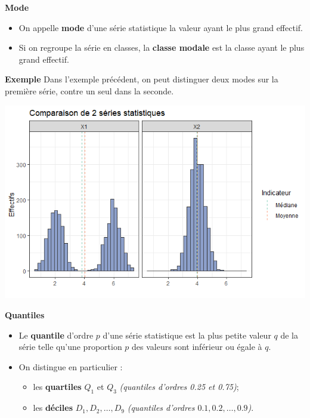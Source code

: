 \documentclass[aspectratio=169,xcolor=dvipsnames]{beamer}
\begin{document}
\begin{frame}
	\begin{block}{\textbf{Mode}}
\begin{footnotesize}
		\begin{itemize}
		\item On appelle \textbf{mode} d'une série statistique la valeur ayant le plus grand effectif.
		\item Si on regroupe la série en classes, la \textbf{classe modale} est la classe ayant le plus grand effectif.
		\end{itemize}
\end{footnotesize}
	\end{block}
	
	\begin{exampleblock}{\textbf{Exemple}}
{\footnotesize 	Dans l'exemple précédent, on peut distinguer deux modes sur la première série, contre un seul dans la seconde.}
		\begin{center}
		\includegraphics[scale=0.35]{comp_moy_med.png}
		\end{center}
	\end{exampleblock}
\end{frame}

\begin{frame}
	\begin{block}{\textbf{Quantiles}}
		\begin{itemize}
		\item Le \textbf{quantile} d'ordre $p$ d'une série statistique est la plus petite valeur $q$ de la série telle qu'une proportion $p$ des valeurs sont inférieur ou égale à $q$.
		\item On distingue en particulier :
			\begin{itemize}
			\item les \textbf{quartiles} $Q_1$ et $Q_3$ \emph{(quantiles d'ordres 0.25 et 0.75)};
			\item les \textbf{déciles} $D_1,D_2,\ldots,D_9$ \emph{(quantiles d'ordres $0.1,0.2,\ldots,0.9$)}.
			\end{itemize}
		\end{itemize}
	\end{block}
\end{frame}
\end{document}
